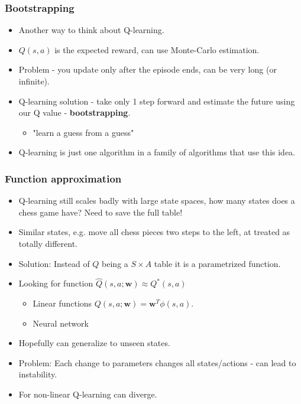 \documentclass[handout]{beamer}
\newcommand{\bw}{\mathbf{w}}
\renewcommand{\high}{\textbf}
\begin{document}
\begin{frame}\frametitle{Bootstrapping}\small

\begin{itemize}
	\item Another way to think about Q-learning.
	\item $Q(s,a)$ is the expected reward, can use Monte-Carlo estimation.
	\onslide<2->\item Problem - you update only after the episode ends, can be very long (or infinite).
	\onslide<3->\item Q-learning solution - take only 1 step forward and estimate the future using our Q value - \high{bootstrapping}.
	\begin{itemize}
		\item "learn a guess from a guess"
	\end{itemize} 
	\item Q-learning is just one algorithm in a family of algorithms that use this idea.
\end{itemize}
\end{frame}

\begin{frame}\frametitle{Function approximation}\small

\begin{itemize}
	\item Q-learning still scales badly with large state spaces, how many states does a chess game have? Need to save the full table!
	\onslide<2->\item Similar states, e.g. move all chess pieces two steps to the left, at treated as totally different.
	\onslide<3->\item Solution: Instead of $Q$ being a $S\times A$ table it is a parametrized function.
	\onslide<4-> \item Looking for function $\hat{Q}(s,a;\bw)\approx Q^*(s,a)$
	\begin{itemize}
		\item Linear functions $Q(s,a;\bw)=\bw^T\phi(s,a)$.
		\item Neural network
	\end{itemize}
	\item Hopefully can generalize to unseen states.
	\onslide<6->\item Problem: Each change to parameters changes all states/actions - can lead to instability.
	\onslide<7->\item For non-linear Q-learning can diverge.
	
\end{itemize}
\end{frame}
\end{document}
